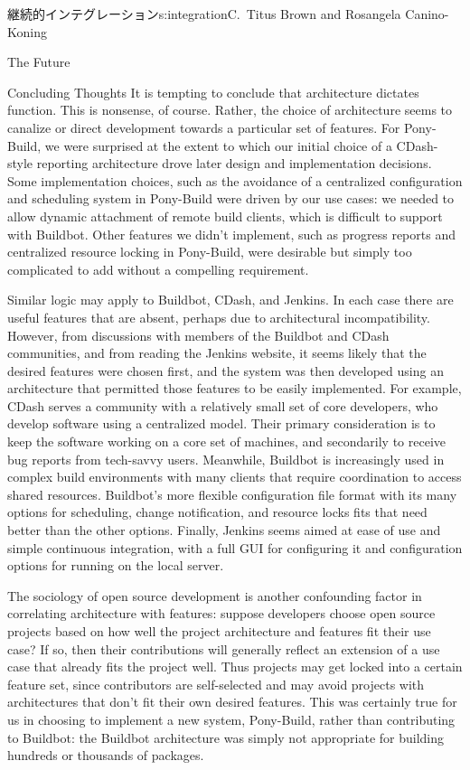 \begin{aosachapter}{継続的インテグレーション}{s:integration}{C.\ Titus Brown and Rosangela Canino-Koning}
\begin{aosasect1}{The Future}
\begin{aosasect2}{Concluding Thoughts}
It is tempting to conclude that architecture dictates function. This
is nonsense, of course. Rather, the choice of architecture seems to
canalize or direct development towards a particular set of
features. For Pony-Build, we were surprised at the extent to which our
initial choice of a CDash-style reporting architecture drove later
design and implementation decisions. Some implementation choices, such
as the avoidance of a centralized configuration and scheduling system
in Pony-Build were driven by our use cases: we needed to allow dynamic
attachment of remote build clients, which is difficult to support with
Buildbot. Other features we didn't implement, such as progress reports
and centralized resource locking in Pony-Build, were desirable but
simply too complicated to add without a compelling requirement.

Similar logic may apply to Buildbot, CDash, and Jenkins. In each case
there are useful features that are absent, perhaps due to
architectural incompatibility. However, from discussions with members
of the Buildbot and CDash communities, and from reading the Jenkins
website, it seems likely that the desired features were chosen first,
and the system was then developed using an architecture that permitted
those features to be easily implemented. For example, CDash serves a
community with a relatively small set of core developers, who develop
software using a centralized model. Their primary consideration is to
keep the software working on a core set of machines, and secondarily
to receive bug reports from tech-savvy users. Meanwhile, Buildbot is
increasingly used in complex build environments with many clients that
require coordination to access shared resources. Buildbot's more
flexible configuration file format with its many options for
scheduling, change notification, and resource locks fits that need
better than the other options. Finally, Jenkins seems aimed at ease of
use and simple continuous integration, with a full GUI for configuring
it and configuration options for running on the local server.

The sociology of open source development is another confounding factor
in correlating architecture with features: suppose developers choose
open source projects based on how well the project architecture and
features fit their use case?  If so, then their contributions will
generally reflect an extension of a use case that already fits the
project well. Thus projects may get locked into a certain feature set,
since contributors are self-selected and may avoid projects with
architectures that don't fit their own desired features. This was
certainly true for us in choosing to implement a new system,
Pony-Build, rather than contributing to Buildbot: the Buildbot
architecture was simply not appropriate for building hundreds or
thousands of packages.


\end{aosasect2}
\end{aosasect1}
\end{aosachapter}
